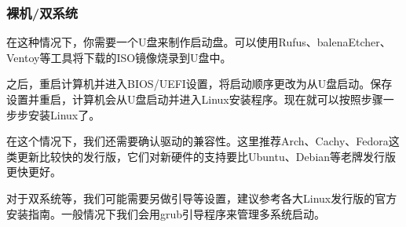 \documentclass[aspectratio=1610]{ctexbeamer}
\begin{document}
\begin{frame}
    \frametitle{裸机/双系统}

    在这种情况下，你需要一个U盘来制作启动盘。可以使用Rufus、balenaEtcher、Ventoy等工具将下载的ISO镜像烧录到U盘中。

    之后，重启计算机并进入BIOS/UEFI设置，将启动顺序更改为从U盘启动。保存设置并重启，计算机会从U盘启动并进入Linux安装程序。现在就可以按照步骤一步步安装Linux了。

    在这个情况下，我们还需要确认驱动的兼容性。这里推荐Arch、Cachy、Fedora这类更新比较快的发行版，它们对新硬件的支持要比Ubuntu、Debian等老牌发行版更快更好。

    \vspace{0.5cm}

    对于双系统等，我们可能需要另做引导等设置，建议参考各大Linux发行版的官方安装指南。一般情况下我们会用grub引导程序来管理多系统启动。

\end{frame}
\end{document}
